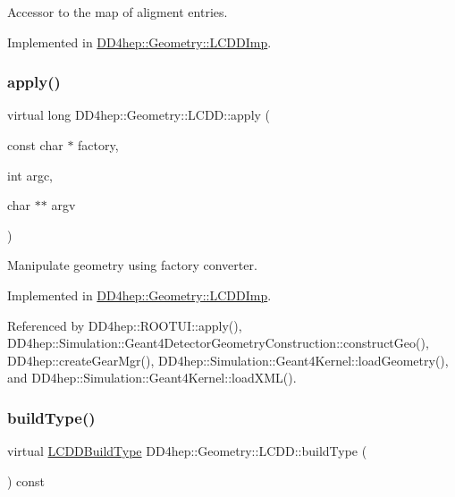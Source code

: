 Accessor to the map of aligment entries. 



Implemented in \hyperlink{class_d_d4hep_1_1_geometry_1_1_l_c_d_d_imp_a0485d198203f72180e45aa12832c5f5e}{D\+D4hep\+::\+Geometry\+::\+L\+C\+D\+D\+Imp}.

\hypertarget{class_d_d4hep_1_1_geometry_1_1_l_c_d_d_ab47f82e5a5bfda6f58624b3553a08c68}{}\label{class_d_d4hep_1_1_geometry_1_1_l_c_d_d_ab47f82e5a5bfda6f58624b3553a08c68} 
\subsubsection{\texorpdfstring{apply()}{apply()}}
{\footnotesize\ttfamily virtual long D\+D4hep\+::\+Geometry\+::\+L\+C\+D\+D\+::apply (\begin{DoxyParamCaption}\item[{const char $\ast$}]{factory,  }\item[{int}]{argc,  }\item[{char $\ast$$\ast$}]{argv }\end{DoxyParamCaption})\hspace{0.3cm}{\ttfamily [pure virtual]}}



Manipulate geometry using factory converter. 



Implemented in \hyperlink{class_d_d4hep_1_1_geometry_1_1_l_c_d_d_imp_a3dfdf0180fa0a61067bd1f12fa15ecd6}{D\+D4hep\+::\+Geometry\+::\+L\+C\+D\+D\+Imp}.



Referenced by D\+D4hep\+::\+R\+O\+O\+T\+U\+I\+::apply(), D\+D4hep\+::\+Simulation\+::\+Geant4\+Detector\+Geometry\+Construction\+::construct\+Geo(), D\+D4hep\+::create\+Gear\+Mgr(), D\+D4hep\+::\+Simulation\+::\+Geant4\+Kernel\+::load\+Geometry(), and D\+D4hep\+::\+Simulation\+::\+Geant4\+Kernel\+::load\+X\+M\+L().

\hypertarget{class_d_d4hep_1_1_geometry_1_1_l_c_d_d_a73400f14f6384e1c84470595fc3667fd}{}\label{class_d_d4hep_1_1_geometry_1_1_l_c_d_d_a73400f14f6384e1c84470595fc3667fd} 
\subsubsection{\texorpdfstring{build\+Type()}{buildType()}}
{\footnotesize\ttfamily virtual \hyperlink{namespace_d_d4hep_acafe43ba4537ab6e999e808142965fab}{L\+C\+D\+D\+Build\+Type} D\+D4hep\+::\+Geometry\+::\+L\+C\+D\+D\+::build\+Type (\begin{DoxyParamCaption}{ }\end{DoxyParamCaption}) const\hspace{0.3cm}{\ttfamily [pure virtual]}}



